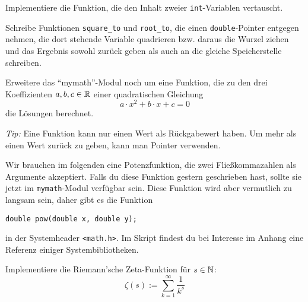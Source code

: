 \documentclass{uebungszettel}
\begin{document}
\begin{aufg}
Implementiere die Funktion, die den Inhalt zweier \verb|int|-Variablen vertauscht.
\end{aufg}

\begin{aufg}
Schreibe Funktionen \verb|square_to| und \verb|root_to|, die einen \verb|double|-Pointer entgegen nehmen, die dort 
stehende Variable quadrieren bzw. daraus die Wurzel ziehen und das Ergebnis sowohl zurück geben als auch an die gleiche 
Speicherstelle schreiben.
\end{aufg}

\begin{aufg}
Erweitere das "`mymath"'-Modul noch um eine Funktion, die zu den drei Koeffizienten $a, b, c \in \mathbb{R}$ einer quadratischen
 Gleichung $$
a \cdot x^2 + b \cdot x + c = 0 $$
die Lösungen berechnet.

\medskip \noindent \emph{Tip:} Eine Funktion kann nur einen Wert als Rückgabewert haben. Um mehr als einen Wert zurück 
zu geben, kann man Pointer verwenden.
\end{aufg}


Wir brauchen im folgenden eine Potenzfunktion, die zwei Fließkommazahlen als Argumente akzeptiert. Falls du diese 
Funktion gestern geschrieben hast, sollte sie jetzt im \verb|mymath|-Modul verfügbar sein. Diese Funktion wird aber 
vermutlich zu langsam sein, daher gibt es die Funktion 

\begin{verbatim}
double pow(double x, double y);
\end{verbatim}

in der Systemheader \verb|<math.h>|. Im Skript findest du bei Interesse im Anhang eine Referenz einiger 
Systembibliotheken.

\begin{aufg}
Implementiere die Riemann'sche Zeta-Funktion für $s \in \mathbb{N}$: $$
\zeta(s) := \sum_{k=1}^\infty \frac{1}{k^s} $$
\end{aufg}
\end{document}
